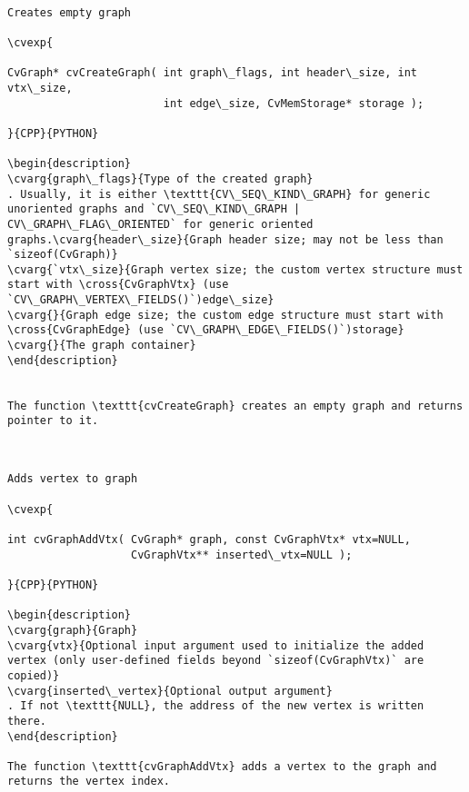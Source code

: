 \begin{verbatim}

Creates empty graph

\cvexp{

CvGraph* cvCreateGraph( int graph\_flags, int header\_size, int vtx\_size,
                        int edge\_size, CvMemStorage* storage );

}{CPP}{PYTHON}

\begin{description}
\cvarg{graph\_flags}{Type of the created graph}
. Usually, it is either \texttt{CV\_SEQ\_KIND\_GRAPH} for generic unoriented graphs and `CV\_SEQ\_KIND\_GRAPH | CV\_GRAPH\_FLAG\_ORIENTED` for generic oriented graphs.\cvarg{header\_size}{Graph header size; may not be less than `sizeof(CvGraph)}
\cvarg{`vtx\_size}{Graph vertex size; the custom vertex structure must start with \cross{CvGraphVtx} (use `CV\_GRAPH\_VERTEX\_FIELDS()`)edge\_size}
\cvarg{}{Graph edge size; the custom edge structure must start with \cross{CvGraphEdge} (use `CV\_GRAPH\_EDGE\_FIELDS()`)storage}
\cvarg{}{The graph container}
\end{description}


The function \texttt{cvCreateGraph} creates an empty graph and returns pointer to it.


\end{verbatim}
\begin{verbatim}

Adds vertex to graph

\cvexp{

int cvGraphAddVtx( CvGraph* graph, const CvGraphVtx* vtx=NULL,
                   CvGraphVtx** inserted\_vtx=NULL );

}{CPP}{PYTHON}

\begin{description}
\cvarg{graph}{Graph}
\cvarg{vtx}{Optional input argument used to initialize the added vertex (only user-defined fields beyond `sizeof(CvGraphVtx)` are copied)}
\cvarg{inserted\_vertex}{Optional output argument}
. If not \texttt{NULL}, the address of the new vertex is written there.
\end{description}

The function \texttt{cvGraphAddVtx} adds a vertex to the graph and returns the vertex index.


\end{verbatim}

